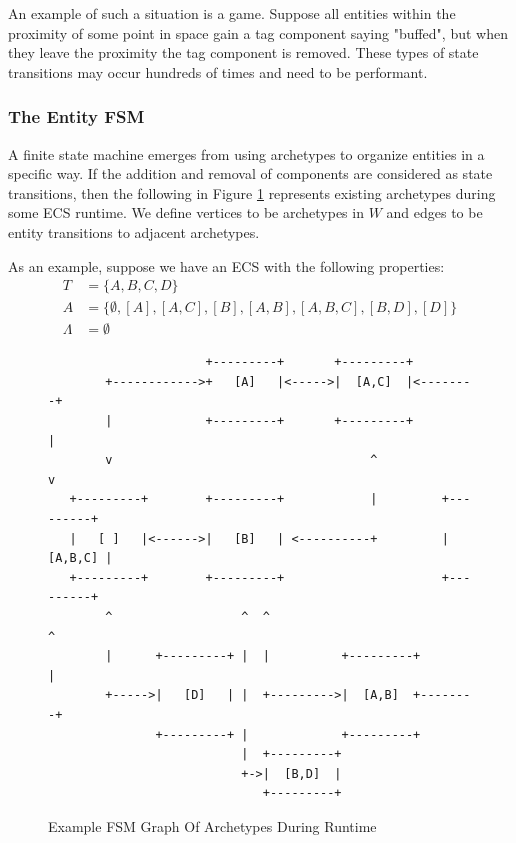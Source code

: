 An example of such a situation is a game. Suppose all entities within the proximity of some point in space gain a tag component saying "buffed", but when they leave the proximity the tag component is removed. These types of state transitions may occur hundreds of times and need to be performant. 

\subsubsection{The Entity FSM}

A finite state machine emerges from using archetypes to organize entities in a specific way. If the addition and removal of components are considered as state transitions, then the following in Figure \ref{fig:graph1} represents existing archetypes during some ECS runtime. We define vertices to be archetypes in $W$ and edges to be entity transitions to adjacent archetypes.

As an example, suppose we have an ECS with the following properties:
\begin{align}
    T &= \{A,B,C,D\} \\
    A &= \{ \emptyset, [A] , [A,C] ,[B], [A,B], [A,B,C], [B,D], [D]\} \\
    \Lambda &= \emptyset
\end{align}
                                    
\begin{figure}[htbp]
    \centering
    \begin{verbatim}
                      +---------+       +---------+                                  
        +------------>+   [A]   |<----->|  [A,C]  |<--------+                        
        |             +---------+       +---------+         |                        
        v                                    ^              v                        
   +---------+        +---------+            |         +---------+                   
   |   [ ]   |<------>|   [B]   | <----------+         | [A,B,C] |                   
   +---------+        +---------+                      +---------+                   
        ^                  ^  ^                             ^                        
        |      +---------+ |  |          +---------+        |                        
        +----->|   [D]   | |  +--------->|  [A,B]  +--------+                        
               +---------+ |             +---------+                                 
                           |  +---------+                                            
                           +->|  [B,D]  |                                            
                              +---------+                                            
    \end{verbatim}
    \caption{Example FSM Graph Of Archetypes During Runtime}
    \label{fig:graph1}
\end{figure}

